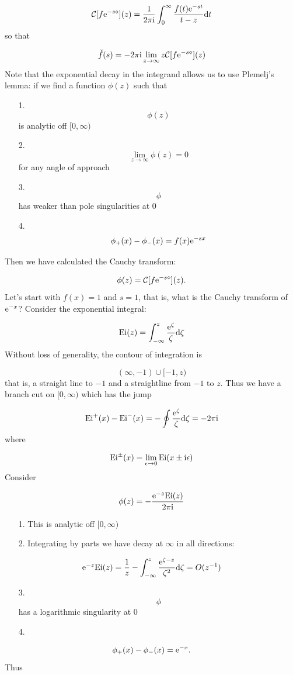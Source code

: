 \documentclass[12pt,a4paper]{article}
\def\D{ {\rm d} }
\def\I{ {\rm i} }
\def\E{ {\rm e} }
\def\CC{ {\cal C} }
\begin{document}
\[
\CC[f \E^{-s \diamond}](z) = {1 \over 2 \pi \I} \int_0^\infty {f(t) \E^{-s t} \over t- z} \D t
\]
so that

\[
\check f(s) = -2 \pi \I\lim_{z \rightarrow \infty}  z \CC[f \E^{-s \diamond}](z) 
\]
Note that the exponential decay in the integrand allows us to use Plemelj's lemma: if we find a  function $\phi(z)$ such that

\begin{itemize}
\item[1. ] \[
\phi(z)
\]
is analytic off $[0,\infty)$


\item[2. ] \[
\lim_{z \rightarrow \infty} \phi(z) = 0
\]
for any angle of approach


\item[3. ] \[
\phi
\]
has weaker than pole singularities at 0


\item[4. ] \[
\phi_+(x) - \phi_-(x) = f(x) \E^{-s x}
\]
\end{itemize}
Then we have calculated the Cauchy transform:

\[
\phi(z) = \CC[f \E^{-s \diamond}](z).
\]
Let's start with $f(x) = 1$ and $s = 1$, that is, what is the Cauchy transform of $\E^{-x}$?  Consider the exponential integral:

\[
{\rm Ei}(z) = \int_{-\infty}^z {\E^\zeta \over \zeta} \D \zeta
\]
Without loss of generality, the contour of integration is

\[
(\infty,-1) \cup [-1, z)
\]
that is, a straight line to $-1$ and a straightline from $-1$ to $z$.   Thus we have a branch cut on $[0,\infty)$ which has the jump

\[
{\rm Ei}^+(x) - {\rm Ei}^-(x) = -\oint {\E^\zeta \over \zeta} \D \zeta = -2 \pi \I
\]
where 

\[
{\rm Ei}^\pm(x) = \lim_{\epsilon \rightarrow 0} {\rm Ei}(x\pm\I \epsilon)
\]
Consider

\[
\phi(z) = -{\E^{-z} {\rm Ei}(z) \over 2 \pi \I }
\]
\begin{itemize}
\item[1. ] This is analytic off $[0,\infty)$


\item[2. ] Integrating by parts we have decay at $\infty$ in all directions:

\end{itemize}
\[
\E^{-z} {\rm Ei}(z) = {1  \over z}  - \int_{-\infty}^z {\E^{\zeta-z} \over \zeta^2} \D \zeta = O(z^{-1})
\]
\begin{itemize}
\item[3. ] \[
\phi
\]
has a logarithmic singularity at 0


\item[4. ] \end{itemize}
\[
\phi_+(x) - \phi_-(x) = \E^{-x}.
\]
Thus 
\end{document}

